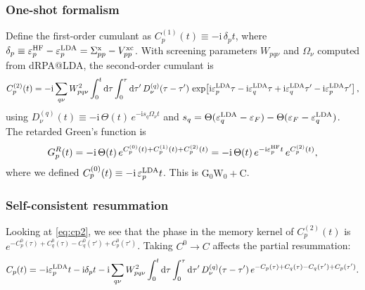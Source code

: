 \subsubsection{One-shot formalism}
Define the first-order cumulant as $C_p^{(1)}(t) \equiv -\mathrm{i}\,\delta_p t$, where $
\delta_p \equiv \varepsilon_p^{\rm HF}-\varepsilon_p^{\rm LDA} = \Sigma^{\rm x}_{pp}-V^{\rm xc}_{pp}$. With screening parameters $W_{pq\nu}$ and $\Omega_\nu$ computed from dRPA@LDA, the second-order cumulant is
\begin{equation}
C_p^{(2)}(t)=-\mathrm{i} \sum_{q \nu} W_{p q \nu}^2 \int_0^t \mathrm{d}\tau \int_0^\tau \mathrm{d}\tau'\,
D_\nu^{(q)}(\tau-\tau')\,
\exp\!\left[\mathrm{i} \varepsilon_p^{\rm LDA} \tau-\mathrm{i} \varepsilon_q^{\rm LDA} \tau
+\mathrm{i} \varepsilon_q^{\rm LDA} \tau'-\mathrm{i} \varepsilon_p^{\rm LDA} \tau'\right], \label{eq:cp2}
\end{equation}
using $D_\nu^{(q)}(t) \equiv -\mathrm{i}\, \Theta(t)\, e^{-\mathrm{i} s_q \Omega_\nu t}$ and
$s_q= \Theta(\varepsilon_q^{\rm LDA} - \varepsilon_F) - \Theta(\varepsilon_F - \varepsilon_q^{\rm LDA})$.
The retarded Green's function is
\begin{equation}
G_p^R(t) = -\mathrm{i}\, \Theta(t)\, e^{C_p^{(0)}(t)+C_p^{(1)}(t)+C_p^{(2)}(t)}
= -\mathrm{i}\, \Theta(t)\, e^{-\mathrm{i}\varepsilon_p^{\rm HF} t}\, e^{C_p^{(2)}(t)} ,
\end{equation}
where we defined $C_p^{(0)}(t) \equiv -\mathrm{i}\,\varepsilon_p^{\rm LDA} t$. This is $\mathrm{G_0W_0{+}C}$.
\subsubsection{Self-consistent resummation}
Looking at \ref{eq:cp2}, we see that the phase in the memory kernel of $C_p^{(2)}(t)$ is
$e^{-C^0_p(\tau)+C^0_q(\tau)-C^0_q(\tau')+C^0_p(\tau')}$. Taking $C^0\to C$ affects the partial resummation:
\begin{equation}
C_p(t) = -\mathrm{i}\varepsilon_p^{\rm LDA} t - \mathrm{i}\delta_p t
  - \mathrm{i}\sum_{q\nu} W_{pq\nu}^2 \int_0^t \mathrm{d}\tau \int_0^\tau \mathrm{d}\tau'\,
  D^{(q)}_\nu(\tau-\tau')\, e^{-C_p(\tau)+C_q(\tau)-C_q(\tau')+C_p(\tau')} .
\end{equation}
